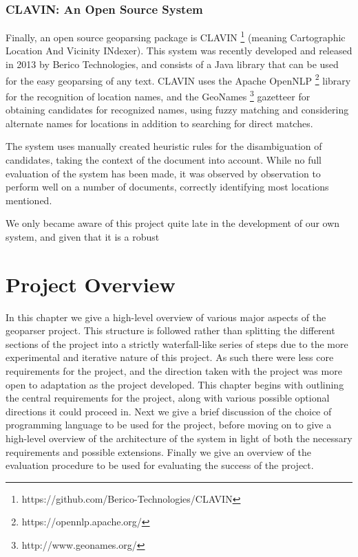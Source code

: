 \documentclass[12pt, a4paper]{report}
\begin{document}

\subsection{CLAVIN: An Open Source System}
\label{subsec:clavin}

Finally, an open source geoparsing package is CLAVIN \footnote{https://github.com/Berico-Technologies/CLAVIN} (meaning Cartographic Location And Vicinity INdexer). This system was recently developed and released in 2013 by Berico Technologies, and consists of a Java library that can be used for the easy geoparsing of any text. CLAVIN uses the Apache OpenNLP \footnote{https://opennlp.apache.org/} library for the recognition of location names, and the GeoNames \footnote{http://www.geonames.org/} gazetteer for obtaining candidates for recognized names, using fuzzy matching and considering alternate names for locations in addition to searching for direct matches.

The system uses manually created heuristic rules for the disambiguation of candidates, taking the context of the document into account. While no full evaluation of the system has been made, it was observed by observation to perform well on a number of documents, correctly identifying most locations mentioned.

We only became aware of this project quite late in the development of our own system, and given that it is a robust 

\chapter{Project Overview}

In this chapter we give a high-level overview of various major aspects of the geoparser project. This structure is followed rather than splitting the different sections of the project into a strictly waterfall-like series of steps due to the more experimental and iterative nature of this project. As such there were less core requirements for the project, and the direction taken with the project was more open to adaptation as the project developed. This chapter begins with outlining the central requirements for the project, along with various possible optional directions it could proceed in. Next we give a brief discussion of the choice of programming language to be used for the project, before moving on to give a high-level overview of the architecture of the system in light of both the necessary requirements and possible extensions. Finally we give an overview of the evaluation procedure to be used for evaluating the success of the project.
\end{document}
